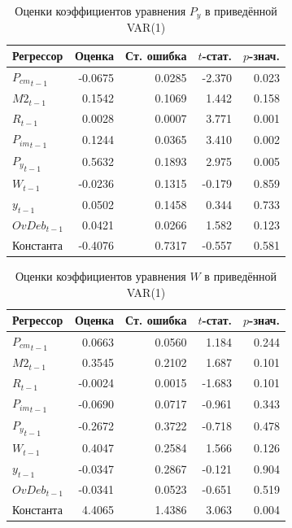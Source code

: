 \begin{table}[H]
\centering
\small

\begin{tabular}{l|r|r|r|r}
\hline
Регрессор & Оценка & Ст. ошибка & $t$-стат. & $p$-знач.\\
\hline
${P_{cm}}_{t-1}$ & -0.0675 & 0.0285 & -2.370 & 0.023\\
\hline
${M2}_{t-1}$ & 0.1542 & 0.1069 & 1.442 & 0.158\\
\hline
${R}_{t-1}$ & 0.0028 & 0.0007 & 3.771 & 0.001\\
\hline
${P_{im}}_{t-1}$ & 0.1244 & 0.0365 & 3.410 & 0.002\\
\hline
${P_y}_{t-1}$ & 0.5632 & 0.1893 & 2.975 & 0.005\\
\hline
${W}_{t-1}$ & -0.0236 & 0.1315 & -0.179 & 0.859\\
\hline
${y}_{t-1}$ & 0.0502 & 0.1458 & 0.344 & 0.733\\
\hline
${OvDeb}_{t-1}$ & 0.0421 & 0.0266 & 1.582 & 0.123\\
\hline
Константа & -0.4076 & 0.7317 & -0.557 & 0.581\\
\hline
\end{tabular}
\caption{Оценки коэффициентов уравнения $P_y$ в приведённой VAR(1)}
\label{tab:var_coef_cpi}
\end{table}

\begin{table}[H]
\centering
\small

\begin{tabular}{l|r|r|r|r}
\hline
Регрессор & Оценка & Ст. ошибка & $t$-стат. & $p$-знач.\\
\hline
${P_{cm}}_{t-1}$ & 0.0663 & 0.0560 & 1.184 & 0.244\\
\hline
${M2}_{t-1}$ & 0.3545 & 0.2102 & 1.687 & 0.101\\
\hline
${R}_{t-1}$ & -0.0024 & 0.0015 & -1.683 & 0.101\\
\hline
${P_{im}}_{t-1}$ & -0.0690 & 0.0717 & -0.961 & 0.343\\
\hline
${P_y}_{t-1}$ & -0.2672 & 0.3722 & -0.718 & 0.478\\
\hline
${W}_{t-1}$ & 0.4047 & 0.2584 & 1.566 & 0.126\\
\hline
${y}_{t-1}$ & -0.0347 & 0.2867 & -0.121 & 0.904\\
\hline
${OvDeb}_{t-1}$ & -0.0341 & 0.0523 & -0.651 & 0.519\\
\hline
Константа & 4.4065 & 1.4386 & 3.063 & 0.004\\
\hline
\end{tabular}
\caption{Оценки коэффициентов уравнения $W$ в приведённой VAR(1)}
\label{tab:var_coef_wage}
\end{table}

